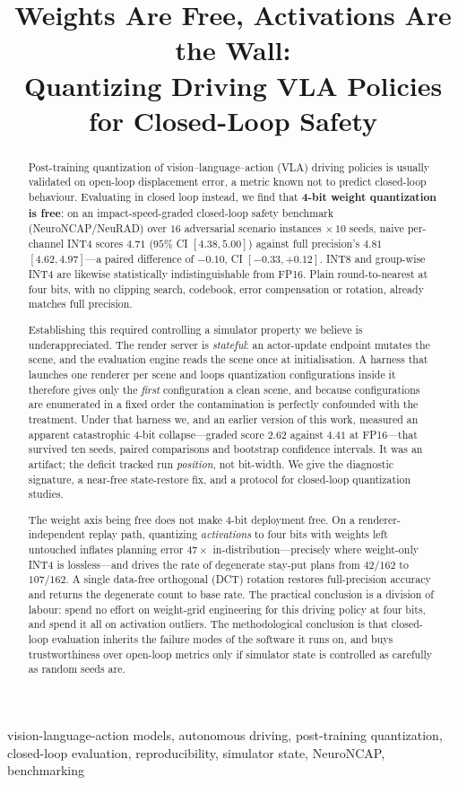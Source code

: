 \documentclass[conference]{IEEEtran}
\title{\textbf{Weights Are Free, Activations Are the Wall:\\
Quantizing Driving VLA Policies for Closed-Loop Safety}}
\author{\IEEEauthorblockN{Anonymous Submission}
\IEEEauthorblockA{Paper ID: XXXX}}
\begin{document}
\maketitle


\begin{abstract}
Post-training quantization of vision--language--action (VLA) driving policies is usually validated
on open-loop displacement error, a metric known not to predict closed-loop behaviour. Evaluating
in closed loop instead, we find that \textbf{4-bit weight quantization is free}: on an
impact-speed-graded closed-loop safety benchmark (NeuroNCAP/NeuRAD) over $16$ adversarial scenario
instances $\times\,10$ seeds, naive per-channel INT4 scores $4.71$ ($95\%$ CI $[4.38,5.00]$)
against full precision's $4.81$ $[4.62,4.97]$---a paired difference of $-0.10$, CI
$[-0.33,+0.12]$. INT8 and group-wise INT4 are likewise statistically indistinguishable from FP16.
Plain round-to-nearest at four bits, with no clipping search, codebook, error compensation or
rotation, already matches full precision.

Establishing this required controlling a simulator property we believe is underappreciated. The
render server is \emph{stateful}: an actor-update endpoint mutates the scene, and the evaluation
engine reads the scene once at initialisation. A harness that launches one renderer per scene and
loops quantization configurations inside it therefore gives only the \emph{first} configuration a
clean scene, and because configurations are enumerated in a fixed order the contamination is
perfectly confounded with the treatment. Under that harness we, and an earlier version of this
work, measured an apparent catastrophic 4-bit collapse---graded score $2.62$ against $4.41$ at
FP16---that survived ten seeds, paired comparisons and bootstrap confidence intervals. It was an
artifact; the deficit tracked run \emph{position}, not bit-width. We give the diagnostic
signature, a near-free state-restore fix, and a protocol for closed-loop quantization studies.

The weight axis being free does not make 4-bit deployment free. On a renderer-independent replay
path, quantizing \emph{activations} to four bits with weights left untouched inflates planning
error $47\times$ in-distribution---precisely where weight-only INT4 is lossless---and drives the
rate of degenerate stay-put plans from $42/162$ to $107/162$. A single data-free orthogonal (DCT)
rotation restores full-precision accuracy and returns the degenerate count to base rate. The
practical conclusion is a division of labour: spend no effort on weight-grid engineering for
this driving policy at four bits, and spend it all on activation outliers. The methodological
conclusion is that closed-loop evaluation inherits the failure modes of the software it runs on,
and buys trustworthiness over open-loop metrics only if simulator state is controlled as carefully
as random seeds are.
\end{abstract}
\begin{IEEEkeywords}
vision-language-action models, autonomous driving, post-training quantization, closed-loop
evaluation, reproducibility, simulator state, NeuroNCAP, benchmarking
\end{IEEEkeywords}
\end{document}
